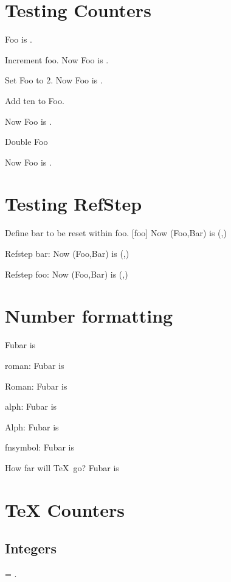 \documentclass{article}
\begin{document}
\section{Testing Counters}
Foo is \thefoo.

Increment foo.
Now Foo is  \thefoo.


Set Foo to 2.
\setcounter{foo}{2}
Now Foo is  \thefoo.

Add ten to Foo.
\addtocounter{foo}{10}
Now Foo is  \thefoo.

Double Foo
\addtocounter{foo}{\value{foo}}
Now Foo is  \thefoo.

\section{Testing RefStep}
Define bar to be reset within foo.
[foo]
Now (Foo,Bar) is (\thefoo,\thebar)

Refstep bar: 
Now (Foo,Bar) is (\thefoo,\thebar)

Refstep foo: 
Now (Foo,Bar) is (\thefoo,\thebar)

\section{Number formatting}
\setcounter{fubar}{6}
Fubar is \thefubar

roman:
\renewcommand{\thefubar}{}
Fubar is \thefubar

Roman:
\renewcommand{\thefubar}{}
Fubar is \thefubar

alph:
\renewcommand{\thefubar}{}
Fubar is \thefubar

Alph:
\renewcommand{\thefubar}{}
Fubar is \thefubar

fnsymbol:
\renewcommand{\thefubar}{}
Fubar is \thefubar

How far will \TeX\ go?
\renewcommand{\thefubar}{}
\setcounter{fubar}{9999}
Fubar is \thefubar

\section{TeX Counters}
\subsection{Integers}
\countdef{}
 = \the\two.
\end{document}
